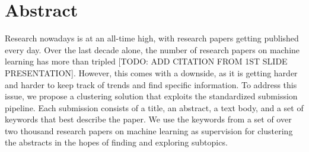 \section{Abstract}
Research nowadays is at an all-time high, with research papers getting published every day. Over the last decade alone, the number of research papers on machine learning has more than tripled [TODO: ADD CITATION FROM 1ST SLIDE PRESENTATION]. However, this comes with a downside, as it is getting harder and harder to keep track of trends and find specific information. To address this issue, we propose a clustering solution that exploits the standardized submission pipeline. Each submission consists of a title, an abstract, a text body, and a set of keywords that best describe the paper. We use the keywords from a set of over two thousand research papers on machine learning as supervision for clustering the abstracts in the hopes of finding and exploring subtopics.